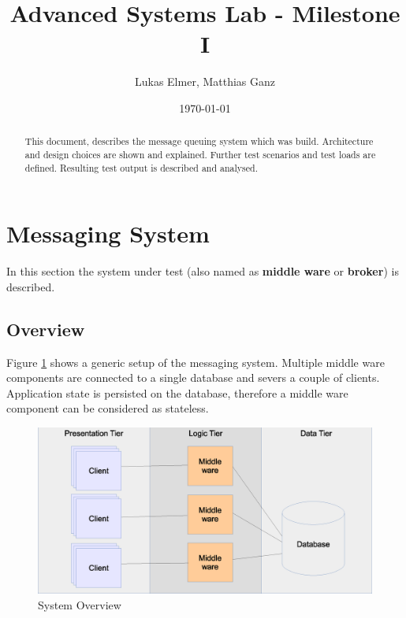 \documentclass[a4paper]{article}
\title{Advanced Systems Lab - Milestone I}
\author{Lukas Elmer, Matthias Ganz}
\date{\today}
\begin{document}
\maketitle


\begin{abstract}

This document, describes the message queuing system which was build. Architecture and design choices are shown and explained. Further test scenarios and test loads are defined. Resulting test output is described and analysed.

\end{abstract}



\section{Messaging System}
In this section the system under test (also named as \textbf{middle ware}  or \textbf{broker}) is described.


\subsection{Overview}

Figure \ref{fig:system-overview} shows a generic setup of the messaging system. Multiple middle ware components are connected to a single database and severs a couple of clients. Application state is persisted on the database, therefore a middle ware component can be considered as stateless.


\begin{figure}
  \begin{center}
    \includegraphics[scale=0.4]{../drawings/system-overview.eps}
  \end{center}
  \caption{System Overview}
  \label{fig:system-overview}
\end{figure}
\end{document}

